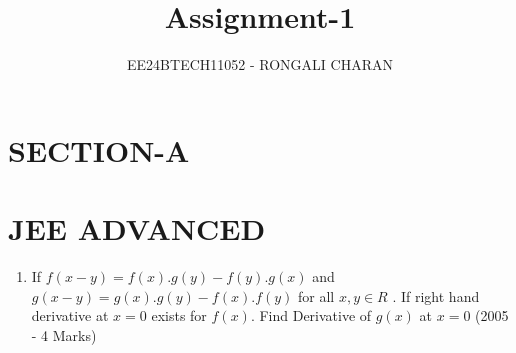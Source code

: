 \documentclass[journal,12pt,twocolumn]{IEEEtran}
\theoremstyle{remark}
\begin{document}

\vspace{3cm}

\title{\textbf{Assignment-1}}
\author{EE24BTECH11052 - RONGALI CHARAN}
\maketitle
\bigskip

\renewcommand{\thefigure}{\theenumi}
\renewcommand{\thetable}{\theenumi}
\onecolumn
\setlength{\columnsep}{2.5em}
\section*{\textbf{SECTION-A}}
\section*{\textbf{JEE ADVANCED}}
\begin{enumerate}
\subsection*{E - Subjective Problems}
    \item If $f(x-y)=f(x).g(y)-f(y).g(x)$ and $ g(x-y)=g(x).g(y)-f(x).f(y) $ for all $x,y \in R $ . If right hand derivative at $x=0$ exists for $f(x)$. Find Derivative of $g(x)$ at $x=0$
   \hfill(2005 - 4 Marks)
\end{enumerate}
\end{document}
